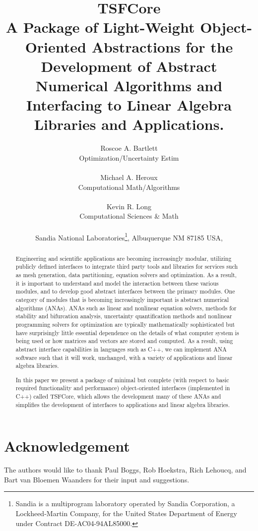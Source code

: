 \documentclass[pdf,ps2pdf,11pt]{SANDreport}
\title{
{\Huge\bf TSFCore}\\[1.5ex]
A Package of Light-Weight Object-Oriented Abstractions for the
Development of Abstract Numerical Algorithms and Interfacing
to Linear Algebra Libraries and Applications.
}
\author{
Roscoe A. Bartlett \\ Optimization/Uncertainty Estim \\ \\
Michael A. Heroux \\ Computational Math/Algorithms \\ \\
Kevin R. Long \\ Computational Sciences \& Math \\ \\
Sandia National Laboratories\footnote{
Sandia is a multiprogram laboratory operated by Sandia Corporation, a
Lockheed-Martin Company, for the United States Department of Energy
under Contract DE-AC04-94AL85000.}, Albuquerque NM 87185 USA, \\
}
\date{}
\begin{document}
\maketitle

%

%
\begin{abstract}
%
Engineering and scientific applications are becoming increasingly
modular, utilizing publicly defined interfaces to integrate
third party tools and libraries for services such as
mesh generation, data partitioning, equation solvers and optimization.
As a result, it is important to understand and model the interaction between 
these various modules, and to develop good abstract interfaces between
the primary modules.  One category of modules that is becoming
increasingly important is abstract numerical algorithms (ANAs).  ANAs
such as linear and nonlinear equation solvers,
methods for stability and bifurcation analysis,
uncertainty quantification methods and nonlinear programming solvers
for optimization are typically mathematically 
sophisticated but have surprisingly little essential dependence on the
details of what computer system is being used or how matrices and
vectors are stored and computed.  As a result, using abstract
interface capabilities in languages such as C++, we can implement ANA
software such that it will work, unchanged, with a variety of
applications and linear algebra libraries.

In this paper we present a package of minimal but complete (with
respect to basic required functionality and performance)
object-oriented interfaces (implemented in C++) called TSFCore, which
allows the development many of these ANAs and simplifies the
development of interfaces to applications and linear algebra
libraries.
%
\end{abstract}
%

%
\clearpage
\section*{Acknowledgement}
The authors would like to thank Paul Boggs, Rob Hoekstra, Rich
Lehoucq, and Bart van Bloemen Waanders for their input and
suggestions.
\end{document}
